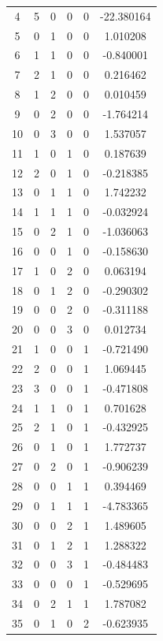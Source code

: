 \documentclass[preprint,12pt]{elsarticle}
\begin{document}
\begin{table}
\begin{minipage}[!h]{0.25\textwidth}
{\begin{tabular}{|c|cccc|c|}
4  &   5 &   0 &   0 &   0 & -22.380164 \\
5  &   0 &   1 &   0 &   0 &   1.010208 \\
6  &   1 &   1 &   0 &   0 &  -0.840001 \\
7  &   2 &   1 &   0 &   0 &   0.216462 \\
8  &   1 &   2 &   0 &   0 &   0.010459 \\
9  &   0 &   2 &   0 &   0 &  -1.764214 \\
10 &   0 &   3 &   0 &   0 &   1.537057 \\
11 &   1 &   0 &   1 &   0 &   0.187639 \\
12 &   2 &   0 &   1 &   0 &  -0.218385 \\
13 &   0 &   1 &   1 &   0 &   1.742232 \\
14 &   1 &   1 &   1 &   0 &  -0.032924 \\
15 &   0 &   2 &   1 &   0 &  -1.036063 \\
16 &   0 &   0 &   1 &   0 &  -0.158630 \\
17 &   1 &   0 &   2 &   0 &   0.063194 \\
18 &   0 &   1 &   2 &   0 &  -0.290302 \\
19 &   0 &   0 &   2 &   0 &  -0.311188 \\
20 &   0 &   0 &   3 &   0 &   0.012734 \\
21 &   1 &   0 &   0 &   1 &  -0.721490 \\
22 &   2 &   0 &   0 &   1 &   1.069445 \\
23 &   3 &   0 &   0 &   1 &  -0.471808 \\
24 &   1 &   1 &   0 &   1 &   0.701628 \\
25 &   2 &   1 &   0 &   1 &  -0.432925 \\
26 &   0 &   1 &   0 &   1 &   1.772737 \\
27 &   0 &   2 &   0 &   1 &  -0.906239 \\
28 &   0 &   0 &   1 &   1 &   0.394469 \\
29 &   0 &   1 &   1 &   1 &  -4.783365 \\
30 &   0 &   0 &   2 &   1 &   1.489605 \\
31 &   0 &   1 &   2 &   1 &   1.288322 \\
32 &   0 &   0 &   3 &   1 &  -0.484483 \\
33 &   0 &   0 &   0 &   1 &  -0.529695 \\
34 &   0 &   2 &   1 &   1 &   1.787082 \\
35 &   0 &   1 &   0 &   2 &  -0.623935 \\

\end{tabular}}
\end{minipage}
\end{table}
\end{document}
